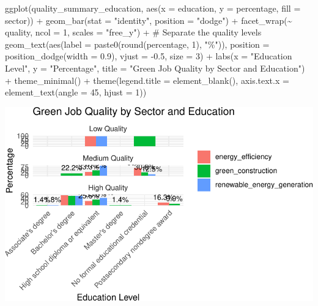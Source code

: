 \documentclass[
  letterpaper,
  DIV=11,
  numbers=noendperiod]{scrartcl}
\newenvironment{Shaded}{\begin{snugshade}}{\end{snugshade}}
\newcommand{\AttributeTok}[1]{\textcolor[rgb]{0.40,0.45,0.13}{#1}}
\newcommand{\CommentTok}[1]{\textcolor[rgb]{0.37,0.37,0.37}{#1}}
\newcommand{\DecValTok}[1]{\textcolor[rgb]{0.68,0.00,0.00}{#1}}
\newcommand{\FloatTok}[1]{\textcolor[rgb]{0.68,0.00,0.00}{#1}}
\newcommand{\FunctionTok}[1]{\textcolor[rgb]{0.28,0.35,0.67}{#1}}
\newcommand{\NormalTok}[1]{\textcolor[rgb]{0.00,0.23,0.31}{#1}}
\newcommand{\SpecialCharTok}[1]{\textcolor[rgb]{0.37,0.37,0.37}{#1}}
\newcommand{\StringTok}[1]{\textcolor[rgb]{0.13,0.47,0.30}{#1}}
\begin{document}
\begin{Shaded}
\begin{Highlighting}[]
\FunctionTok{ggplot}\NormalTok{(quality\_summary\_education, }\FunctionTok{aes}\NormalTok{(}\AttributeTok{x =}\NormalTok{ education, }\AttributeTok{y =}\NormalTok{ percentage, }\AttributeTok{fill =}\NormalTok{ sector)) }\SpecialCharTok{+}
  \FunctionTok{geom\_bar}\NormalTok{(}\AttributeTok{stat =} \StringTok{"identity"}\NormalTok{, }\AttributeTok{position =} \StringTok{"dodge"}\NormalTok{) }\SpecialCharTok{+}
  \FunctionTok{facet\_wrap}\NormalTok{(}\SpecialCharTok{\textasciitilde{}}\NormalTok{ quality, }\AttributeTok{ncol =} \DecValTok{1}\NormalTok{, }\AttributeTok{scales =} \StringTok{"free\_y"}\NormalTok{) }\SpecialCharTok{+} \CommentTok{\# Separate the quality levels}
  \FunctionTok{geom\_text}\NormalTok{(}\FunctionTok{aes}\NormalTok{(}\AttributeTok{label =} \FunctionTok{paste0}\NormalTok{(}\FunctionTok{round}\NormalTok{(percentage, }\DecValTok{1}\NormalTok{), }\StringTok{"\%"}\NormalTok{)), }
            \AttributeTok{position =} \FunctionTok{position\_dodge}\NormalTok{(}\AttributeTok{width =} \FloatTok{0.9}\NormalTok{), }\AttributeTok{vjust =} \SpecialCharTok{{-}}\FloatTok{0.5}\NormalTok{, }\AttributeTok{size =} \DecValTok{3}\NormalTok{) }\SpecialCharTok{+}
  \FunctionTok{labs}\NormalTok{(}\AttributeTok{x =} \StringTok{"Education Level"}\NormalTok{, }\AttributeTok{y =} \StringTok{"Percentage"}\NormalTok{, }\AttributeTok{title =} \StringTok{"Green Job Quality by Sector and Education"}\NormalTok{) }\SpecialCharTok{+}
  \FunctionTok{theme\_minimal}\NormalTok{() }\SpecialCharTok{+}
  \FunctionTok{theme}\NormalTok{(}\AttributeTok{legend.title =} \FunctionTok{element\_blank}\NormalTok{(), }\AttributeTok{axis.text.x =} \FunctionTok{element\_text}\NormalTok{(}\AttributeTok{angle =} \DecValTok{45}\NormalTok{, }\AttributeTok{hjust =} \DecValTok{1}\NormalTok{))}
\end{Highlighting}
\end{Shaded}

\includegraphics{index_files/figure-pdf/unnamed-chunk-29-1.pdf}
\end{document}
